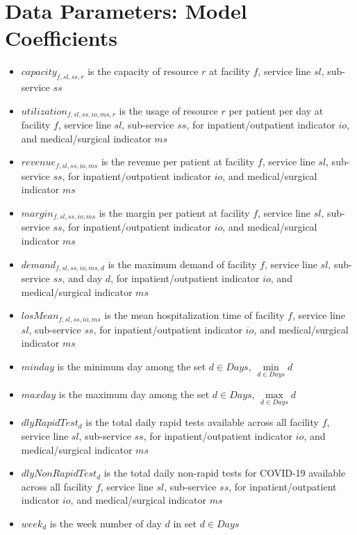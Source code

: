 \documentclass[10pt, letterpaper]{article}
\begin{document}
\section*{Data Parameters: Model Coefficients}
\begin{itemize}
\item[ ] $capacity_{f,sl,ss,r}$  is the capacity of resource $r$ at facility $f$, service line $sl$, sub-service $ss$
\item[ ] $utilization_{f,sl,ss,io,ms,r}$ is the usage of resource $r$ per patient per day at facility $f$, service line $sl$, sub-service $ss$, for inpatient/outpatient indicator $io$, and medical/surgical indicator $ms$
\item[ ] $revenue_{f,sl,ss,io,ms}$  is the revenue per patient at facility $f$, service line $sl$, sub-service $ss$, for inpatient/outpatient indicator $io$, and medical/surgical indicator $ms$
\item[ ] $margin_{f,sl,ss,io,ms}$  is the margin per patient at facility $f$, service line $sl$, sub-service $ss$, for inpatient/outpatient indicator $io$, and medical/surgical indicator $ms$
\item[ ] $demand_{f,sl,ss,io,ms,d}$ is the maximum demand of facility $f$, service line $sl$, sub-service $ss$, and day $d$, for inpatient/outpatient indicator $io$, and medical/surgical indicator $ms$
\item[ ] $losMean_{f,sl,ss,io,ms}$  is the mean hospitalization time of facility $f$, service line $sl$, sub-service $ss$, for inpatient/outpatient indicator $io$, and medical/surgical indicator $ms$
\item[ ] $minday$ is the minimum day among the set $ d \in Days$, ${\min\limits_{d \in Days} d}$
\item[ ] $maxday$ is the maximum day among the set $ d \in Days$, ${\max\limits_{d \in Days} d}$
\item[ ] $dlyRapidTest_{d}$ is the total daily rapid tests available across all facility $f$, service line $sl$, sub-service $ss$, for inpatient/outpatient indicator $io$, and medical/surgical indicator $ms$ 
\item[ ] $dlyNonRapidTest_{d}$ is the total daily non-rapid tests for COVID-19 available across all facility $f$, service line $sl$, sub-service $ss$, for inpatient/outpatient indicator $io$, and medical/surgical indicator $ms$ 
\item[ ] $week_{d}$ is the week number of day $d$ in set $ d \in Days$

\pagebreak


\end{itemize}
\end{document}

